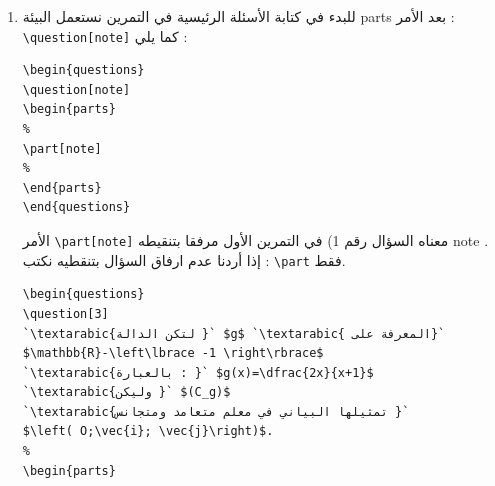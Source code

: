 \documentclass[11pt,A4]{article}
\begin{document}
\begin{enumerate}
\begin{enumerate}[label=\alph*)]
\begin{tcolorbox}[attach boxed title to top right=
{yshift=-\tcboxedtitleheight/3,xshift=-5mm},title=\textarabic{\sffamily مثال},colbacktitle=BrickRed,sidebyside]
\begin{flushright}
\uline{\textbf{\sffamily التمرين الأول :}}   
(1 نقطة)\\
\vspace{0.3cm}
\uline{\textbf{\sffamily التمرين الثاني :}}   
(3 نقاط)
\end{flushright}

\tcblower
نكتب الأمر
\begin{english}
\begin{lstlisting}
\begin{questions}
\question[1]
\question[3]
\end{questions}
\end{lstlisting}
\end{english}
\end{tcolorbox}
\item
للبدء في كتابة الأسئلة الرئيسية في التمرين نستعمل البيئة
parts
بعد الأمر :
\verb#\question[note]#
كما يلي :
\begin{english}
\begin{lstlisting}
\begin{questions}
\question[note]
\begin{parts}
%
\part[note] 
%
\end{parts}
\end{questions}
\end{lstlisting}
\end{english}
الأمر 
\verb#\part[note]#
معناه السؤال رقم 
1)
 في التمرين الأول مرفقا بتنقيطه note
.\\
إذا أردنا عدم ارفاق السؤال بتنقطيه نكتب :
\verb#\part#
فقط.

 \begin{tcolorbox}[attach boxed title to top right=
{yshift=-\tcboxedtitleheight/3,xshift=-5mm},title=\textarabic{\sffamily مثال},colbacktitle=BrickRed]
\begin{english}
\begin{lstlisting}
\begin{questions}
\question[3]
`\textarabic{لتكن الدالة }` $g$ `\textarabic{ المعرفة على}` $\mathbb{R}-\left\lbrace -1 \right\rbrace$ 
`\textarabic{بالعبارة : }` $g(x)=\dfrac{2x}{x+1}$
`\textarabic{وليكن }` $(C_g)$
`\textarabic{تمثيلها البياني في معلم متعامد ومتجانس }`
$\left( O;\vec{i}; \vec{j}\right)$.
%
\begin{parts}

\end{lstlisting}
\end{english}
\end{tcolorbox}
\end{enumerate}
\end{enumerate}
\end{document}
